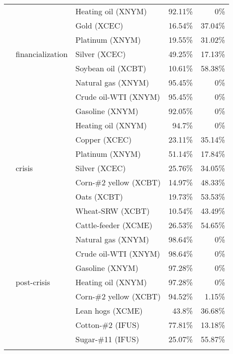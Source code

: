 \documentclass[]{elsarticle} %
\begin{document}
\begin{longtable}[t]{>{}lllrr}
\nopagebreak
 &  & Heating oil (XNYM) & 92.11\% & 0\%\\
\nopagebreak
 &  & Gold (XCEC) & 16.54\% & 37.04\%\\
\nopagebreak
 &  & Platinum (XNYM) & 19.55\% & 31.02\%\\
\nopagebreak
 & \multirow[t]{-8}{*}{\raggedright\arraybackslash financialization} & Silver (XCEC) & 49.25\% & 17.13\%\\
\nopagebreak
 &  & Soybean oil (XCBT) & 10.61\% & 58.38\%\\
\nopagebreak
 &  & Natural gas (XNYM) & 95.45\% & 0\%\\
\nopagebreak
 &  & Crude oil-WTI (XNYM) & 95.45\% & 0\%\\
\nopagebreak
 &  & Gasoline (XNYM) & 92.05\% & 0\%\\
\nopagebreak
 &  & Heating oil (XNYM) & 94.7\% & 0\%\\
\nopagebreak
 &  & Copper (XCEC) & 23.11\% & 35.14\%\\
\nopagebreak
 &  & Platinum (XNYM) & 51.14\% & 17.84\%\\
\nopagebreak
 & \multirow[t]{-8}{*}{\raggedright\arraybackslash crisis} & Silver (XCEC) & 25.76\% & 34.05\%\\
\nopagebreak
 &  & Corn-\#2 yellow (XCBT) & 14.97\% & 48.33\%\\
\nopagebreak
 &  & Oats (XCBT) & 19.73\% & 53.53\%\\
\nopagebreak
 &  & Wheat-SRW (XCBT) & 10.54\% & 43.49\%\\
\nopagebreak
 &  & Cattle-feeder (XCME) & 26.53\% & 54.65\%\\
\nopagebreak
 &  & Natural gas (XNYM) & 98.64\% & 0\%\\
\nopagebreak
 &  & Crude oil-WTI (XNYM) & 98.64\% & 0\%\\
\nopagebreak
 &  & Gasoline (XNYM) & 97.28\% & 0\%\\
\nopagebreak
\multirow[t]{-32}{*}{\raggedright\arraybackslash \textbf{open interest}} & \multirow[t]{-8}{*}{\raggedright\arraybackslash post-crisis} & Heating oil (XNYM) & 97.28\% & 0\%\\
\cmidrule{1-5}\pagebreak[0]
 &  & Corn-\#2 yellow (XCBT) & 94.52\% & 1.15\%\\
\nopagebreak
 &  & Lean hogs (XCME) & 43.8\% & 36.68\%\\
\nopagebreak
 &  & Cotton-\#2 (IFUS) & 77.81\% & 13.18\%\\
\nopagebreak
 &  & Sugar-\#11 (IFUS) & 25.07\% & 55.87\%\\
\nopagebreak

\end{longtable}
\end{document}
